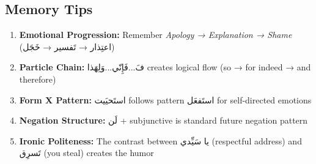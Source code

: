 \documentclass[a4paper,12pt]{article}
\begin{document}
\subsection{Memory Tips}
\begin{enumerate}
\item \textbf{Emotional Progression:} Remember \textit{Apology → Explanation → Shame} (\textarabic{اعتِذار → تَفسير → خَجَل})
\item \textbf{Particle Chain:} \textarabic{فَ...فَإِنّي...وَلِهَذا} creates logical flow (so → for indeed → and therefore)
\item \textbf{Form X Pattern:} \textarabic{استَحيَيت} follows pattern \textarabic{استَفعَل} for self-directed emotions
\item \textbf{Negation Structure:} \textarabic{لَن + subjunctive} is standard future negation pattern
\item \textbf{Ironic Politeness:} The contrast between \textarabic{يا سَيِّدي} (respectful address) and \textarabic{تَسرِق} (you steal) creates the humor
\end{enumerate}
\end{document}
